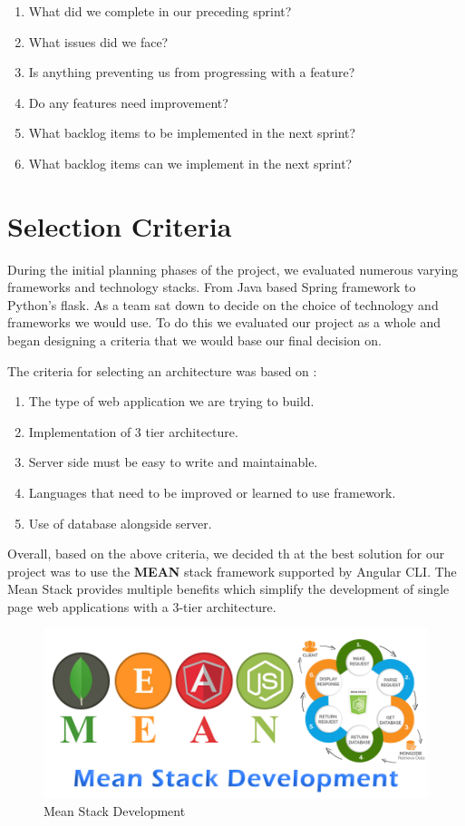 \begin{enumerate}
  \item What did we complete in our preceding sprint?
  \item What issues did we face?
  \item Is anything preventing us from progressing with a feature?
  \item Do any features need improvement?
  \item What backlog items to be implemented in the next sprint?
  \item What backlog items can we implement in the next sprint?
\end{enumerate}

\section{Selection Criteria}
During the initial planning phases of the project, we evaluated numerous varying frameworks and technology stacks. From Java based Spring framework to Python's flask. As a team sat down to decide on the choice of technology and frameworks we would use. To do this we evaluated our project as a whole and began designing a criteria that we would base our final decision on. 

The criteria for selecting an architecture was based on :
\begin{enumerate}
  \item The type of web application we are trying to build.
  \item Implementation of 3 tier architecture.
  \item Server side must be easy to write and maintainable.
  \item Languages that need to be improved or learned to use framework.
  \item Use of database alongside server.
\end{enumerate}
Overall, based on the above criteria, we decided th         at the best solution for our project was to use the \textbf{MEAN} stack framework supported by Angular CLI. The Mean Stack provides multiple benefits which simplify the development of single page web applications with a 3-tier architecture. 

\begin{figure}[H]
  \includegraphics[width=\linewidth]{img/msd.png}
  \caption{Mean Stack Development}
  \label{fig:mena-stack}
\end{figure}

